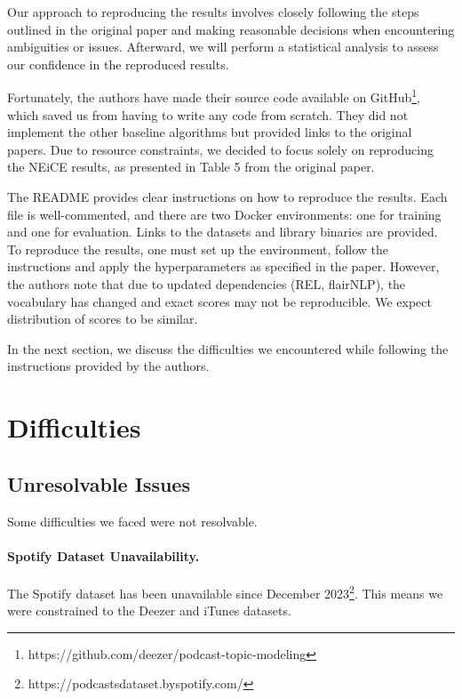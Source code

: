 \documentclass[manuscript]{acmart}
\begin{document}
Our approach to reproducing the results involves closely following the steps outlined in the original paper and making reasonable decisions when encountering ambiguities or issues. Afterward, we will perform a statistical analysis to assess our confidence in the reproduced results.

Fortunately, the authors have made their source code available on GitHub\footnote{https://github.com/deezer/podcast-topic-modeling}, which saved us from having to write any code from scratch. They did not implement the other baseline algorithms but provided links to the original papers. Due to resource constraints, we decided to focus solely on reproducing the NEiCE results, as presented in Table 5 from the original paper.

The README provides clear instructions on how to reproduce the results. Each file is well-commented, and there are two Docker environments: one for training and one for evaluation. Links to the datasets and library binaries are provided. To reproduce the results, one must set up the environment, follow the instructions and apply the hyperparameters as specified in the paper. However, the authors note that due to updated dependencies (REL, flairNLP), the vocabulary has changed and exact scores may not be reproducible. We expect distribution of scores to be similar.

In the next section, we discuss the difficulties we encountered while following the instructions provided by the authors.

\section{Difficulties}

\subsection{Unresolvable Issues}


Some difficulties we faced were not resolvable.

\paragraph{Spotify Dataset Unavailability.} The Spotify dataset has been unavailable since December 2023\footnote{https://podcastsdataset.byspotify.com/}. This means we were constrained to the Deezer and iTunes datasets.
\end{document}
